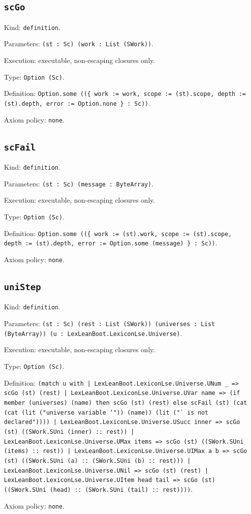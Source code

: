 \documentclass[11pt]{article}
\begin{document}
\subsection*{\texttt{scGo}}
\noindent Kind: \texttt{definition}.\par
\noindent Parameters: \texttt{(st : Sc) (work : List (SWork))}.\par
\noindent Execution: executable, non-escaping closures only.\par
\noindent Type: \texttt{Option (Sc)}.\par
\noindent Definition: \texttt{Option.some ((\{ work := work, scope := (st).scope, depth := (st).depth, error := Option.none \} : Sc))}.\par
\noindent Axiom policy: \texttt{none}.\par
\subsection*{\texttt{scFail}}
\noindent Kind: \texttt{definition}.\par
\noindent Parameters: \texttt{(st : Sc) (message : ByteArray)}.\par
\noindent Execution: executable, non-escaping closures only.\par
\noindent Type: \texttt{Option (Sc)}.\par
\noindent Definition: \texttt{Option.some ((\{ work := (st).work, scope := (st).scope, depth := (st).depth, error := Option.some (message) \} : Sc))}.\par
\noindent Axiom policy: \texttt{none}.\par
\subsection*{\texttt{uniStep}}
\noindent Kind: \texttt{definition}.\par
\noindent Parameters: \texttt{(st : Sc) (rest : List (SWork)) (universes : List (ByteArray)) (u : LexLeanBoot.LexiconLse.Universe)}.\par
\noindent Execution: executable, non-escaping closures only.\par
\noindent Type: \texttt{Option (Sc)}.\par
\noindent Definition: \texttt{(match u with | LexLeanBoot.LexiconLse.Universe.UNum \_ => scGo (st) (rest) | LexLeanBoot.LexiconLse.Universe.UVar name => (if member (universes) (name) then scGo (st) (rest) else scFail (st) (cat (cat (lit ("universe variable `")) (name)) (lit ("` is not declared")))) | LexLeanBoot.LexiconLse.Universe.USucc inner => scGo (st) ((SWork.SUni (inner) :: rest)) | LexLeanBoot.LexiconLse.Universe.UMax items => scGo (st) ((SWork.SUni (items) :: rest)) | LexLeanBoot.LexiconLse.Universe.UIMax a b => scGo (st) ((SWork.SUni (a) :: (SWork.SUni (b) :: rest))) | LexLeanBoot.LexiconLse.Universe.UNil => scGo (st) (rest) | LexLeanBoot.LexiconLse.Universe.UItem head tail => scGo (st) ((SWork.SUni (head) :: (SWork.SUni (tail) :: rest))))}.\par
\noindent Axiom policy: \texttt{none}.\par
\end{document}
